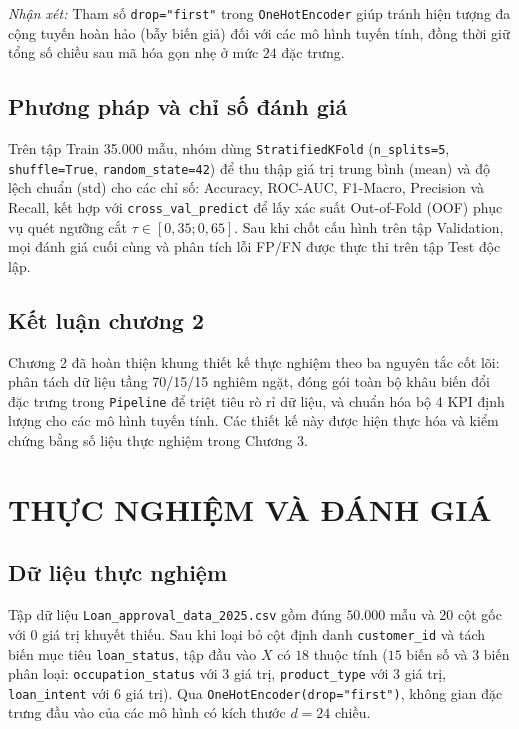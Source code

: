 \documentclass[12pt,a4paper,oneside]{report}
\begin{document}
\textit{Nhận xét:} Tham số \texttt{drop="first"} trong \texttt{OneHotEncoder} giúp tránh hiện tượng đa cộng tuyến hoàn hảo (bẫy biến giả) đối với các mô hình tuyến tính, đồng thời giữ tổng số chiều sau mã hóa gọn nhẹ ở mức $24$ đặc trưng.

\section{Phương pháp và chỉ số đánh giá}

Trên tập Train 35.000 mẫu, nhóm dùng \texttt{StratifiedKFold} (\texttt{n\_splits=5}, \texttt{shuffle=True}, \texttt{random\_state=42}) để thu thập giá trị trung bình ($\text{mean}$) và độ lệch chuẩn ($\text{std}$) cho các chỉ số: Accuracy, ROC-AUC, F1-Macro, Precision và Recall, kết hợp với \texttt{cross\_val\_predict} để lấy xác suất Out-of-Fold (OOF) phục vụ quét ngưỡng cắt $\tau \in [0{,}35; 0{,}65]$. Sau khi chốt cấu hình trên tập Validation, mọi đánh giá cuối cùng và phân tích lỗi FP/FN được thực thi trên tập Test độc lập.

\section{Kết luận chương 2}

Chương 2 đã hoàn thiện khung thiết kế thực nghiệm theo ba nguyên tắc cốt lõi: phân tách dữ liệu tầng 70/15/15 nghiêm ngặt, đóng gói toàn bộ khâu biến đổi đặc trưng trong \texttt{Pipeline} để triệt tiêu rò rỉ dữ liệu, và chuẩn hóa bộ 4 KPI định lượng cho các mô hình tuyến tính. Các thiết kế này được hiện thực hóa và kiểm chứng bằng số liệu thực nghiệm trong Chương 3.

\chapter{THỰC NGHIỆM VÀ ĐÁNH GIÁ}

\section{Dữ liệu thực nghiệm}

Tập dữ liệu \texttt{Loan\_approval\_data\_2025.csv} gồm đúng $50.000$ mẫu và $20$ cột gốc với $0$ giá trị khuyết thiếu. Sau khi loại bỏ cột định danh \texttt{customer\_id} và tách biến mục tiêu \texttt{loan\_status}, tập đầu vào $X$ có $18$ thuộc tính ($15$ biến số và $3$ biến phân loại: \texttt{occupation\_status} với 3 giá trị, \texttt{product\_type} với 3 giá trị, \texttt{loan\_intent} với 6 giá trị). Qua \texttt{OneHotEncoder(drop="first")}, không gian đặc trưng đầu vào của các mô hình có kích thước $d = 24$ chiều.
\end{document}
